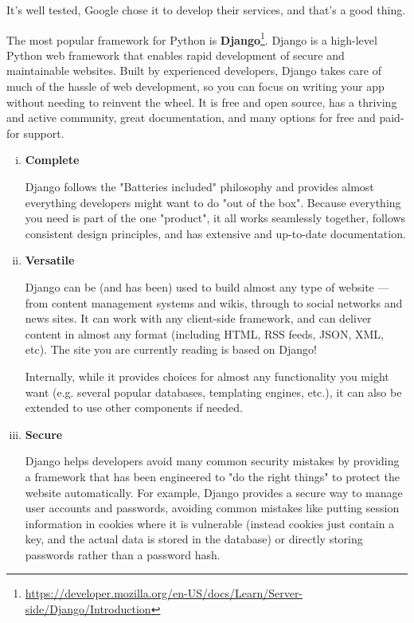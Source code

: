 \documentclass[paper.tex]{subfiles}
\begin{document}
\begin{enumerate}[a.]
   It’s well tested, Google chose it to develop their services, and that’s a good thing.

   The most popular framework for Python is
   \textbf{Django}\footnote{\url{https://developer.mozilla.org/en-US/docs/Learn/Server-side/Django/Introduction}}.
   Django is a high-level Python web framework that enables rapid development of secure and maintainable websites. Built by experienced developers, Django takes care of much of the hassle of web development, so you can focus on writing your app without needing to reinvent the wheel. It is free and open source, has a thriving and active community, great documentation, and many options for free and paid-for support.

   \begin{enumerate}[i.]
     \item \textbf{Complete}
     \par
     Django follows the "Batteries included" philosophy and provides almost everything developers might want to do "out of the box". Because everything you need is part of the one "product", it all works seamlessly together, follows consistent design principles, and has extensive and up-to-date documentation.
     \item \textbf{Versatile}
     \par
     Django can be (and has been) used to build almost any type of website — from content management systems and wikis, through to social networks and news sites. It can work with any client-side framework, and can deliver content in almost any format (including HTML, RSS feeds, JSON, XML, etc). The site you are currently reading is based on Django!

     Internally, while it provides choices for almost any functionality you might want (e.g. several popular databases, templating engines, etc.), it can also be extended to use other components if needed.
     \item \textbf{Secure}
     \par
     Django helps developers avoid many common security mistakes by providing a framework that has been engineered to "do the right things" to protect the website automatically. For example, Django provides a secure way to manage user accounts and passwords, avoiding common mistakes like putting session information in cookies where it is vulnerable (instead cookies just contain a key, and the actual data is stored in the database) or directly storing passwords rather than a password hash.


\end{enumerate}
\end{enumerate}
\end{document}
